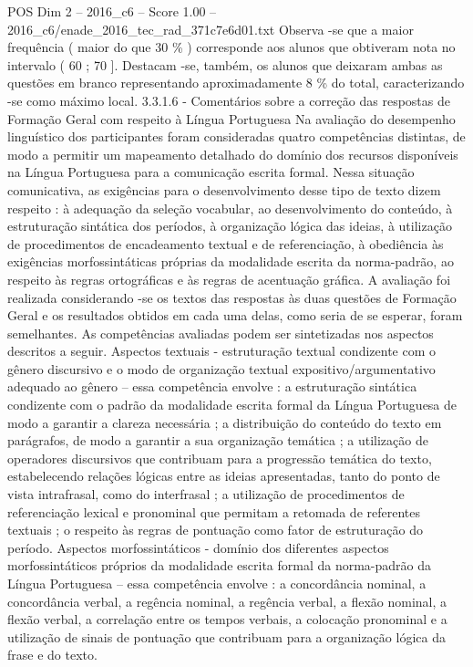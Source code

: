 \begin{textsample}{POS Dim 2 – 2016\_c6 – Score 1.00 – 2016\_c6/enade\_2016\_tec\_rad\_371c7e6d01.txt}
Observa -se que a maior frequência ( maior do que 30 \% ) corresponde aos alunos que obtiveram nota no intervalo ( 60 ; 70 ].
Destacam -se, também, os alunos que deixaram ambas as questões em branco representando aproximadamente 8 \% do total, caracterizando -se como máximo local. 3.3.1.6 - Comentários sobre a correção das respostas de Formação Geral com respeito à Língua Portuguesa Na avaliação do desempenho linguístico dos participantes foram consideradas quatro competências distintas, de modo a permitir um mapeamento detalhado do domínio dos recursos disponíveis na Língua Portuguesa para a comunicação escrita formal.
Nessa situação comunicativa, as exigências para o desenvolvimento desse tipo de texto dizem respeito : à adequação da seleção vocabular, ao desenvolvimento do conteúdo, à estruturação sintática dos períodos, à organização lógica das ideias, à utilização de procedimentos de encadeamento textual e de referenciação, à obediência às exigências morfossintáticas próprias da modalidade escrita da norma-padrão, ao respeito às regras ortográficas e às regras de acentuação gráfica.
A avaliação foi realizada considerando -se os textos das respostas às duas questões de Formação Geral e os resultados obtidos em cada uma delas, como seria de se esperar, foram semelhantes.
As competências avaliadas podem ser sintetizadas nos aspectos descritos a seguir.
Aspectos textuais - estruturação textual condizente com o gênero discursivo e o modo de organização textual expositivo/argumentativo adequado ao gênero – essa competência envolve : a estruturação sintática condizente com o padrão da modalidade escrita formal da Língua Portuguesa de modo a garantir a clareza necessária ; a distribuição do conteúdo do texto em parágrafos, de modo a garantir a sua organização temática ; a utilização de operadores discursivos que contribuam para a progressão temática do texto, estabelecendo relações lógicas entre as ideias apresentadas, tanto do ponto de vista intrafrasal, como do interfrasal ; a utilização de procedimentos de referenciação lexical e pronominal que permitam a retomada de referentes textuais ; o respeito às regras de pontuação como fator de estruturação do período.
Aspectos morfossintáticos - domínio dos diferentes aspectos morfossintáticos próprios da modalidade escrita formal da norma-padrão da Língua Portuguesa – essa competência envolve : a concordância nominal, a concordância verbal, a regência nominal, a regência verbal, a flexão nominal, a flexão verbal, a correlação entre os tempos verbais, a colocação pronominal e a utilização de sinais de pontuação que contribuam para a organização lógica da frase e do texto.

\end{textsample}
